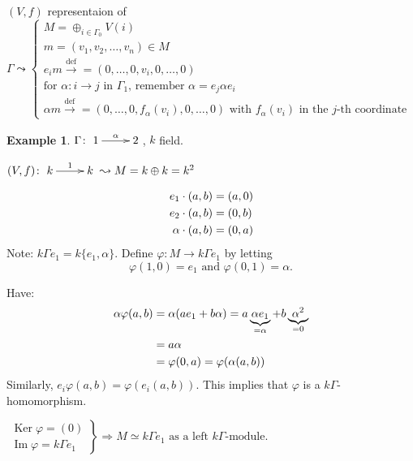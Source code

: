 \documentclass{amsart}
\numberwithin{equation}{section}
\theoremstyle{definition}
\newtheorem{exam}[thm]{Example}
\newcommand{\extto}{\xrightarrow}
\newcommand{\Ker}{\operatorname{Ker}\nolimits}
\renewcommand{\Im}{\operatorname{Im}\nolimits}
\begin{document}
$(V,f)$ representaion of $\Gamma\leadsto \begin{cases}
M = \oplus_{i\in\Gamma_0} V(i)\\
m = (v_1,v_2,\ldots, v_n) \in M\\
e_im \extto{\text{def}}{=} (0,\ldots,0,v_i,0,\ldots,0)\\
\text{for $\alpha\colon i\to j$ in $\Gamma_1$, remember $\alpha =
  e_j\alpha e_i$}\\
\alpha m \extto{\text{def}}{=} (0,\ldots,0,f_\alpha(v_i),0,\ldots,0)
\text{\ with $f_\alpha(v_i)$ in the $j$-th coordinate}
\end{cases}$

\begin{exam}
$\Gamma\colon \xymatrix{1\ar[r]^\alpha & 2}$, $k$ field.

$(V,f)\colon \xymatrix{k\ar[r]^1 & k} \leadsto M = k\oplus k = k^2$

\begin{align}
e_1\cdot (a,b) & = (a, 0)\notag\\
e_2\cdot (a,b) & = (0,b)\notag\\
\alpha\cdot(a,b) & = (0,a)\notag
\end{align}
Note: $k\Gamma e_1 = k\{ e_1,\alpha\}$.  Define $\varphi\colon M\to
k\Gamma e_1$ by letting 
\[\varphi(1,0) = e_1 \text{\ and\ } \varphi(0,1) = \alpha.\]

Have: 
\begin{align}
\alpha \varphi(a,b)  & = \alpha(ae_1 + b\alpha) =
a\underbrace{\alpha e_1}_{=\alpha} +
                       b\underbrace{\alpha^2}_{=0}\notag\\
& = a\alpha\notag\\
& = \varphi(0,a) = \varphi(\alpha(a,b))\notag
\end{align} 
Similarly, $e_i\varphi(a,b) = \varphi(e_i(a,b))$. This implies that
$\varphi$ is a $k\Gamma$-homomorphism.\medskip 

$\left.\begin{matrix}
\Ker \varphi = (0)\\
\Im\varphi = k\Gamma e_1
\end{matrix}\right\} \Rightarrow M\simeq k\Gamma e_1 \text{\ as a left $k\Gamma$-module}.$



\end{exam}
\end{document}
